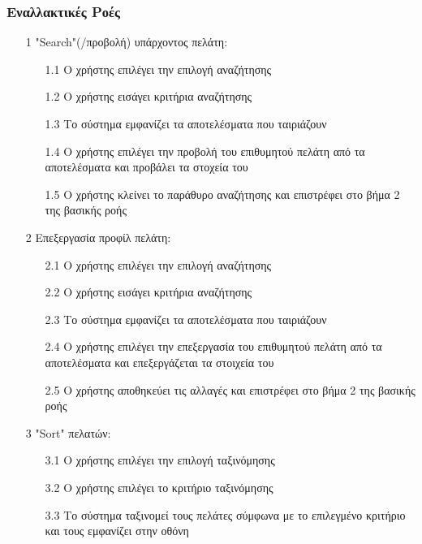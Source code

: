 \documentclass[12pt,a4paper,twoside]{book}
\begin{document}
\subsubsection{Εναλλακτικές Ροές}
\begin{enumerate}
  \item[1 ] "Search"(/προβολή) υπάρχοντος πελάτη: %
        \begin{enumerate}
          \item[1.1 ] Ο χρήστης επιλέγει την επιλογή αναζήτησης
          \item[1.2 ] Ο χρήστης εισάγει κριτήρια αναζήτησης %
          \item[1.3 ] Το σύστημα εμφανίζει τα αποτελέσματα που ταιριάζουν
          \item[1.4 ] Ο χρήστης επιλέγει την προβολή του επιθυμητού πελάτη από τα αποτελέσματα και προβάλει τα στοχεία του
          \item[1.5 ] Ο χρήστης κλείνει το παράθυρο αναζήτησης και επιστρέφει στο βήμα 2 της βασικής ροής
        \end{enumerate}
  \item[2 ] Επεξεργασία προφίλ πελάτη:
        \begin{enumerate}
          \item [2.1 ] Ο χρήστης επιλέγει την επιλογή αναζήτησης
          \item [2.2 ] Ο χρήστης εισάγει κριτήρια αναζήτησης %
          \item [2.3 ] Το σύστημα εμφανίζει τα αποτελέσματα που ταιριάζουν
          \item [2.4 ] Ο χρήστης επιλέγει την επεξεργασία του επιθυμητού πελάτη από τα αποτελέσματα και επεξεργάζεται τα στοιχεία του
          \item [2.5 ] Ο χρήστης αποθηκεύει τις αλλαγές και επιστρέφει στο βήμα 2 της βασικής ροής
        \end{enumerate}
  \item[3 ] "Sort" πελατών: %
        \begin{enumerate}
          \item [3.1 ] Ο χρήστης επιλέγει την επιλογή ταξινόμησης
          \item [3.2 ] Ο χρήστης επιλέγει το κριτήριο ταξινόμησης %
          \item [3.3 ] Το σύστημα ταξινομεί τους πελάτες σύμφωνα με το επιλεγμένο κριτήριο και τους εμφανίζει στην οθόνη
        \end{enumerate}

\end{enumerate}
\end{document}
